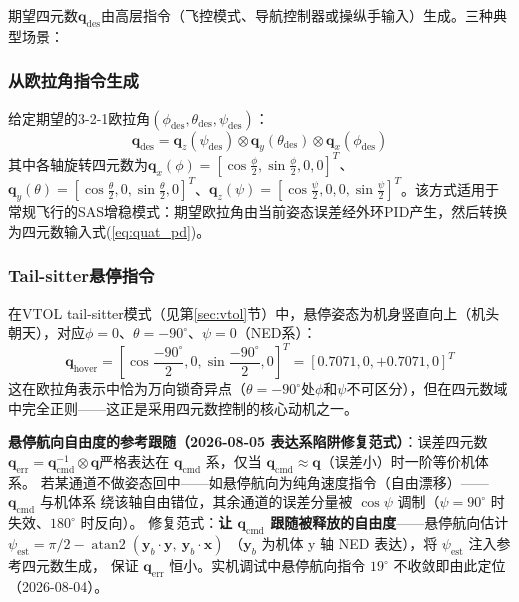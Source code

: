 期望四元数$\mathbf{q}_{\text{des}}$由高层指令（飞控模式、导航控制器或操纵手输入）生成。三种典型场景：

\subsubsection{从欧拉角指令生成}

给定期望的3-2-1欧拉角$(\phi_{\text{des}}, \theta_{\text{des}}, \psi_{\text{des}})$：
\begin{equation}
    \mathbf{q}_{\text{des}} = \mathbf{q}_z(\psi_{\text{des}}) \otimes \mathbf{q}_y(\theta_{\text{des}}) \otimes \mathbf{q}_x(\phi_{\text{des}})
    \label{eq:q_from_euler}
\end{equation}
其中各轴旋转四元数为$\mathbf{q}_x(\phi)=[\cos\frac{\phi}{2}, \sin\frac{\phi}{2}, 0, 0]^T$、$\mathbf{q}_y(\theta)=[\cos\frac{\theta}{2}, 0, \sin\frac{\theta}{2}, 0]^T$、$\mathbf{q}_z(\psi)=[\cos\frac{\psi}{2}, 0, 0, \sin\frac{\psi}{2}]^T$。该方式适用于常规飞行的SAS增稳模式：期望欧拉角由当前姿态误差经外环PID产生，然后转换为四元数输入式(\ref{eq:quat_pd})。

\subsubsection{Tail-sitter悬停指令}

在VTOL tail-sitter模式（见第\ref{sec:vtol}节）中，悬停姿态为机身竖直向上（机头朝天），对应$\phi=0$、$\theta=-90^\circ$、$\psi=0$（NED系）：
\begin{equation}
    \mathbf{q}_{\text{hover}} = \left[\cos\frac{-90^\circ}{2}, 0, \sin\frac{-90^\circ}{2}, 0\right]^T
    = [0.7071, 0, +0.7071, 0]^T
    \label{eq:q_hover}
\end{equation}
这在欧拉角表示中恰为万向锁奇异点（$\theta=-90^\circ$处$\phi$和$\psi$不可区分），但在四元数域中完全正则——这正是采用四元数控制的核心动机之一。

\textbf{悬停航向自由度的参考跟随（2026-08-05 表达系陷阱修复范式）}：误差四元数
$\mathbf{q}_{\text{err}}=\mathbf{q}_{\text{cmd}}^{-1}\otimes\mathbf{q}$严格表达在
$\mathbf{q}_{\text{cmd}}$ 系，仅当 $\mathbf{q}_{\text{cmd}}\approx\mathbf{q}$（误差小）时一阶等价机体系。
若某通道不做姿态回中——如悬停航向为纯角速度指令（自由漂移）——$\mathbf{q}_{\text{cmd}}$ 与机体系
绕该轴自由错位，其余通道的误差分量被 $\cos\psi$ 调制（$\psi=90^\circ$ 时失效、$180^\circ$ 时反向）。
修复范式：\textbf{让 $\mathbf{q}_{\text{cmd}}$ 跟随被释放的自由度}——悬停航向估计
$\psi_{\text{est}} = \pi/2 - \operatorname{atan2}(\mathbf{y}_b\cdot\mathbf{y},\ \mathbf{y}_b\cdot\mathbf{x})$
（$\mathbf{y}_b$ 为机体 y 轴 NED 表达），将 $\psi_{\text{est}}$ 注入参考四元数生成，
保证 $\mathbf{q}_{\text{err}}$ 恒小。实机调试中悬停航向指令 $19^\circ$ 不收敛即由此定位（2026-08-04）。

